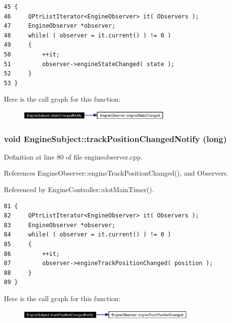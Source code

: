 \footnotesize\begin{verbatim}45 {
46     QPtrListIterator<EngineObserver> it( Observers );
47     EngineObserver *observer;
48     while( ( observer = it.current() ) != 0 )
49     {
50         ++it;
51         observer->engineStateChanged( state );
52     }
53 }
\end{verbatim}\normalsize 


Here is the call graph for this function:\begin{figure}[H]
\begin{center}
\leavevmode
\includegraphics[width=217pt]{classEngineSubject_EngineSubjectb2_cgraph}
\end{center}
\end{figure}
\subsubsection{\setlength{\rightskip}{0pt plus 5cm}void Engine\-Subject::track\-Position\-Changed\-Notify (long)\hspace{0.3cm}{\tt  [protected]}}\label{classEngineSubject_EngineSubjectb5}




Definition at line 80 of file engineobserver.cpp.

References Engine\-Observer::engine\-Track\-Position\-Changed(), and Observers.

Referenced by Engine\-Controller::slot\-Main\-Timer().



\footnotesize\begin{verbatim}81 {
82     QPtrListIterator<EngineObserver> it( Observers );
83     EngineObserver *observer;
84     while( ( observer = it.current() ) != 0 )
85     {
86         ++it;
87         observer->engineTrackPositionChanged( position );
88     }
89 }
\end{verbatim}\normalsize 


Here is the call graph for this function:\begin{figure}[H]
\begin{center}
\leavevmode
\includegraphics[width=253pt]{classEngineSubject_EngineSubjectb5_cgraph}
\end{center}
\end{figure}

